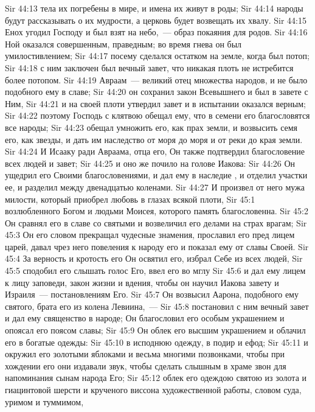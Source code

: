 \vs Sir 44:13 тела их погребены в мире, и имена их живут в роды;
\vs Sir 44:14 народы будут рассказывать о их мудрости, а церковь будет возвещать их хвалу.
\rsbpar\vs Sir 44:15 Енох угодил Господу и был взят на небо,~--- образ покаяния для  родов.
\vs Sir 44:16 Ной оказался совершенным, праведным; во время гнева он был умилостивлением;
\vs Sir 44:17 посему сделался остатком на земле, когда был потоп;
\vs Sir 44:18 с ним заключен был вечный завет, что никакая плоть не истребится более потопом.
\vs Sir 44:19 Авраам~--- великий отец множества народов, и не было подобного ему в славе;
\vs Sir 44:20 он сохранил закон Всевышнего и был в завете с Ним,
\vs Sir 44:21 и на своей плоти утвердил завет и в испытании оказался верным;
\vs Sir 44:22 поэтому Господь с клятвою обещал ему, что в семени его благословятся все народы;
\vs Sir 44:23 обещал умножить его, как прах земли, и возвысить семя его, как звезды, и дать им наследство от моря до моря и от реки до края земли.
\vs Sir 44:24 И Исааку ради Авраама, отца его, Он также подтвердил благословение всех людей и завет;
\vs Sir 44:25 и оно же почило на голове Иакова:
\vs Sir 44:26 Он ущедрил его Своими благословениями, и дал ему в наследие , и отделил участки ее, и разделил между двенадцатью коленами.
\rsbpar\vs Sir 44:27 И произвел от него мужа милости, который приобрел любовь в глазах всякой плоти,
\vs Sir 45:1 возлюбленного Богом и людьми Моисея, которого память благословенна.
\vs Sir 45:2 Он сравнял его в славе со святыми и возвеличил его делами на страх врагам;
\vs Sir 45:3 Он его словом прекращал чудесные знамения, прославил его пред лицем царей, давал чрез него повеления к народу его и показал ему от славы Своей.
\vs Sir 45:4 За верность и кротость его Он освятил его, избрал Себе из всех людей,
\vs Sir 45:5 сподобил его слышать голос Его, ввел его во мглу
\vs Sir 45:6 и дал ему лицем к лицу заповеди, закон жизни и вдения, чтобы он научил Иакова завету и Израиля~--- постановлениям Его.
\vs Sir 45:7 Он возвысил Аарона, подобного ему святого, брата его из колена Левиина,~---
\vs Sir 45:8 постановил с ним вечный завет и дал ему священство в народе; Он благословил его особым украшением и опоясал его поясом славы;
\vs Sir 45:9 Он облек его высшим украшением и облачил его в богатые одежды:
\vs Sir 45:10 в исподнюю одежду, в подир и ефод;
\vs Sir 45:11 и окружил его золотыми яблоками и весьма многими позвонками, чтобы при хождении его они издавали звук, чтобы сделать слышным в храме звон для напоминания сынам народа Его;
\vs Sir 45:12 облек его одеждою святою из золота и гиацинтовой шерсти и крученого виссона художественной работы, словом суда, уримом и туммимом,
